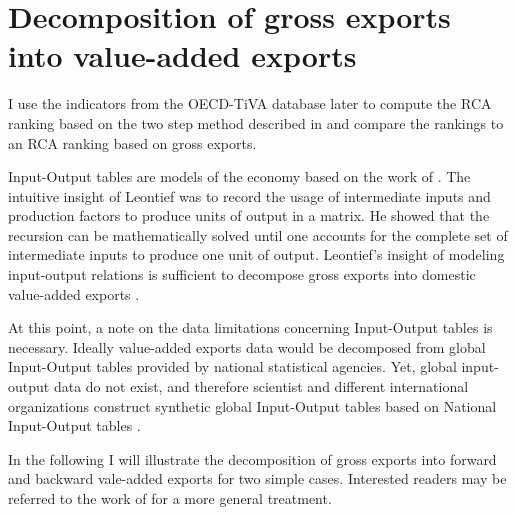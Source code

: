 
\section{Decomposition of gross exports into value-added exports}
I use the indicators from the OECD-TiVA database later to compute the RCA ranking based on the two step method described in \textcite{costinot} and compare the  rankings to an RCA ranking based on gross exports.  
\par 
Input-Output tables are models of the economy based on the work of \textcite{leontief}. The intuitive insight of  Leontief was to record the usage of intermediate inputs and production factors to produce units of output in a matrix. He showed that the recursion  can be mathematically solved until one accounts for the complete set of intermediate inputs to produce one unit of output.  Leontief's insight of modeling input-output relations is sufficient to decompose gross exports into domestic value-added exports \parencite{Koopman}. \par
At this point, a note on the data limitations concerning Input-Output tables is necessary.  Ideally value-added exports data would be decomposed from global Input-Output tables provided by national statistical agencies. Yet, global input-output data do not exist, and therefore scientist and different international organizations construct synthetic global Input-Output tables based on National Input-Output tables \parencite{johnson}. \par 
In the following I will illustrate the decomposition of gross exports into forward and backward vale-added exports for two simple cases. Interested readers may be referred to the work of \textcite{Koopman} for a more general treatment.
